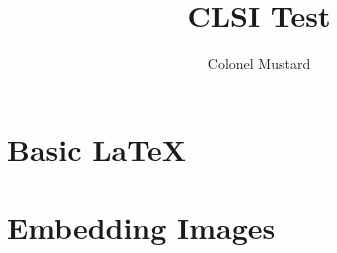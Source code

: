 \documentclass{report}
\title{CLSI Test}
\author{Colonel Mustard}
\begin{document}
  
  \chapter{Basic LaTeX}
  
  
  
  \chapter{Embedding Images}
  
  
  
  \cite{*}
  
  
  
\end{document}
